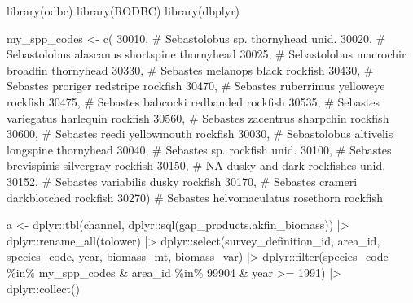 \documentclass[
  letterpaper,
  oneside,
  open=any]{scrbook}
\newenvironment{Shaded}{\begin{snugshade}}{\end{snugshade}}
\newcommand{\CommentTok}[1]{\textcolor[rgb]{0.37,0.37,0.37}{#1}}
\newcommand{\DecValTok}[1]{\textcolor[rgb]{0.68,0.00,0.00}{#1}}
\newcommand{\FunctionTok}[1]{\textcolor[rgb]{0.28,0.35,0.67}{#1}}
\newcommand{\NormalTok}[1]{\textcolor[rgb]{0.00,0.23,0.31}{#1}}
\newcommand{\OtherTok}[1]{\textcolor[rgb]{0.00,0.23,0.31}{#1}}
\newcommand{\SpecialCharTok}[1]{\textcolor[rgb]{0.37,0.37,0.37}{#1}}
\newcommand{\StringTok}[1]{\textcolor[rgb]{0.13,0.47,0.30}{#1}}
\begin{document}
\begin{Shaded}
\begin{Highlighting}[]
\FunctionTok{library}\NormalTok{(odbc)}
\FunctionTok{library}\NormalTok{(RODBC)}
\FunctionTok{library}\NormalTok{(dbplyr)}

\NormalTok{my\_spp\_codes }\OtherTok{\textless{}{-}} \FunctionTok{c}\NormalTok{(}
  \DecValTok{30010}\NormalTok{, }\CommentTok{\#  Sebastolobus sp.    thornyhead unid.}
  \DecValTok{30020}\NormalTok{, }\CommentTok{\#  Sebastolobus alascanus  shortspine thornyhead}
  \DecValTok{30025}\NormalTok{, }\CommentTok{\#  Sebastolobus macrochir  broadfin thornyhead}
  \DecValTok{30330}\NormalTok{, }\CommentTok{\#  Sebastes melanops   black rockfish}
  \DecValTok{30430}\NormalTok{, }\CommentTok{\#  Sebastes proriger   redstripe rockfish}
  \DecValTok{30470}\NormalTok{, }\CommentTok{\#  Sebastes ruberrimus yelloweye rockfish}
  \DecValTok{30475}\NormalTok{, }\CommentTok{\#  Sebastes babcocki   redbanded rockfish}
  \DecValTok{30535}\NormalTok{, }\CommentTok{\#  Sebastes variegatus harlequin rockfish}
  \DecValTok{30560}\NormalTok{, }\CommentTok{\# Sebastes zacentrus   sharpchin rockfish}
  \DecValTok{30600}\NormalTok{, }\CommentTok{\# Sebastes reedi   yellowmouth rockfish}
  \DecValTok{30030}\NormalTok{, }\CommentTok{\# Sebastolobus altivelis   longspine thornyhead}
  \DecValTok{30040}\NormalTok{, }\CommentTok{\# Sebastes sp. rockfish unid.}
  \DecValTok{30100}\NormalTok{, }\CommentTok{\# Sebastes brevispinis silvergray rockfish}
  \DecValTok{30150}\NormalTok{, }\CommentTok{\# NA   dusky and dark rockfishes unid.}
  \DecValTok{30152}\NormalTok{, }\CommentTok{\# Sebastes variabilis  dusky rockfish}
  \DecValTok{30170}\NormalTok{, }\CommentTok{\# Sebastes crameri darkblotched rockfish}
  \DecValTok{30270}\NormalTok{) }\CommentTok{\# Sebastes helvomaculatus  rosethorn rockfish}

\NormalTok{a }\OtherTok{\textless{}{-}}\NormalTok{ dplyr}\SpecialCharTok{::}\FunctionTok{tbl}\NormalTok{(channel, dplyr}\SpecialCharTok{::}\FunctionTok{sql}\NormalTok{(}\StringTok{\textquotesingle{}gap\_products.akfin\_biomass\textquotesingle{}}\NormalTok{)) }\SpecialCharTok{|\textgreater{}} 
\NormalTok{  dplyr}\SpecialCharTok{::}\FunctionTok{rename\_all}\NormalTok{(tolower) }\SpecialCharTok{|\textgreater{}} 
\NormalTok{  dplyr}\SpecialCharTok{::}\FunctionTok{select}\NormalTok{(survey\_definition\_id, area\_id, species\_code, year, biomass\_mt, biomass\_var) }\SpecialCharTok{|\textgreater{}} 
\NormalTok{  dplyr}\SpecialCharTok{::}\FunctionTok{filter}\NormalTok{(species\_code }\SpecialCharTok{\%in\%}\NormalTok{ my\_spp\_codes }\SpecialCharTok{\&} 
\NormalTok{                  area\_id }\SpecialCharTok{\%in\%} \DecValTok{99904} \SpecialCharTok{\&} 
\NormalTok{                  year }\SpecialCharTok{\textgreater{}=} \DecValTok{1991}\NormalTok{) }\SpecialCharTok{|\textgreater{}} 
\NormalTok{  dplyr}\SpecialCharTok{::}\FunctionTok{collect}\NormalTok{() }


\end{Highlighting}
\end{Shaded}
\end{document}
